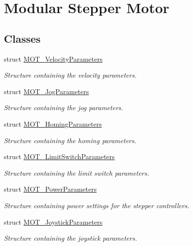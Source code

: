 \hypertarget{group___modular_stepper}{}\section{Modular Stepper Motor}
\label{group___modular_stepper}
\subsection*{Classes}
\begin{DoxyCompactItemize}
\item 
struct \hyperlink{struct_m_o_t___velocity_parameters}{M\+O\+T\+\_\+\+Velocity\+Parameters}
\begin{DoxyCompactList}\small\item\em Structure containing the velocity parameters. \end{DoxyCompactList}\item 
struct \hyperlink{struct_m_o_t___jog_parameters}{M\+O\+T\+\_\+\+Jog\+Parameters}
\begin{DoxyCompactList}\small\item\em Structure containing the jog parameters. \end{DoxyCompactList}\item 
struct \hyperlink{struct_m_o_t___homing_parameters}{M\+O\+T\+\_\+\+Homing\+Parameters}
\begin{DoxyCompactList}\small\item\em Structure containing the homing parameters. \end{DoxyCompactList}\item 
struct \hyperlink{struct_m_o_t___limit_switch_parameters}{M\+O\+T\+\_\+\+Limit\+Switch\+Parameters}
\begin{DoxyCompactList}\small\item\em Structure containing the limit switch parameters. \end{DoxyCompactList}\item 
struct \hyperlink{struct_m_o_t___power_parameters}{M\+O\+T\+\_\+\+Power\+Parameters}
\begin{DoxyCompactList}\small\item\em Structure containing power settings for the stepper controllers. \end{DoxyCompactList}\item 
struct \hyperlink{struct_m_o_t___joystick_parameters}{M\+O\+T\+\_\+\+Joystick\+Parameters}
\begin{DoxyCompactList}\small\item\em Structure containing the joystick parameters. \end{DoxyCompactList}\end{DoxyCompactItemize}
